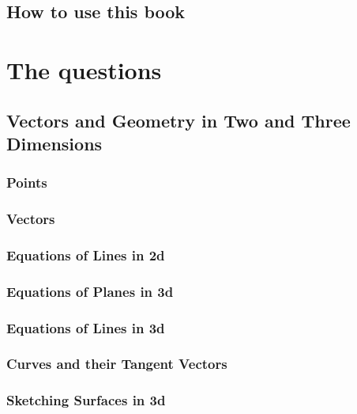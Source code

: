 \documentclass[12pt,letterpaper, openany]{book}
\begin{document}
\frontmatter

\chapter{How to use this book}


\tableofcontents

\mainmatter

\part{The questions}


\chapter{Vectors and Geometry in Two and Three Dimensions}
\setcounter{section}{0}
\section{Points}

\section{Vectors}

\section{Equations of Lines in 2d}

\section{Equations of Planes in 3d}

\section{Equations of Lines in 3d}

\section{Curves and their Tangent Vectors}

\section{Sketching Surfaces in 3d}

%
%
\end{document}
